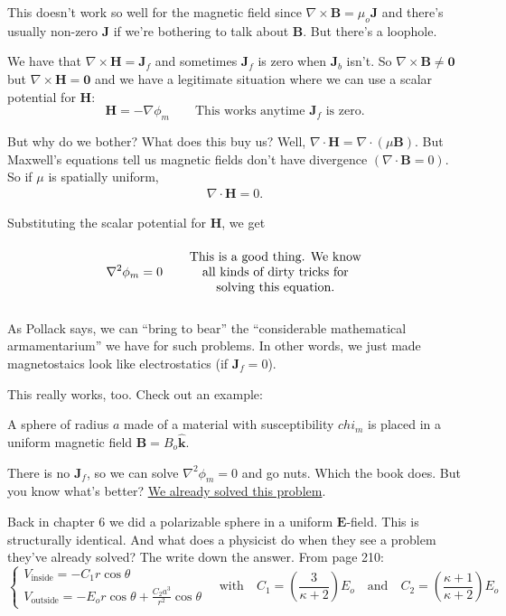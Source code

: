 \documentclass{article}
\numberwithin{equation}{section}
\newcommand{\khat}{\mathbf{\hat{k}}}
\begin{document}
This doesn't work so well for the magnetic field since $\nabla \times \bm{B} = \mu_o \bm{J}$ and there's usually non-zero $\bm{J}$ if we're bothering to talk about $\bm{B}$. But there's a loophole.

We have that $\nabla \times \bm{H} = \bm{J}_f$ and sometimes $\bm{J}_f$ is zero when $\bm{J}_b$ isn't. So $\nabla \times \bm{B} \neq \bm{0}$ but $\nabla \times \bm{H} = \bm{0}$ and we have a legitimate situation where we can use a scalar potential for $\bm{H}$:
\begin{equation*}
    \bm{H} = -\nabla \phi_m \qquad \text{This works anytime } \bm{J}_f \text{ is zero.}
\end{equation*}

But why do we bother? What does this buy us? Well, $\nabla \cdot \bm{H} = \nabla \cdot \left( \mu \bm{B} \right)$. But Maxwell's equations tell us magnetic fields don't have divergence $\left( \nabla \cdot \bm{B} = 0 \right)$.  So if $\mu$ is spatially uniform,
\begin{gather*}
    \nabla \cdot \bm{H} = 0.
\end{gather*}

Substituting the scalar potential for $\bm{H}$, we get
\begin{equation*}
    \nabla^2 \phi_m = 0 \qquad {\parbox[c]{0.4\linewidth}{\begin{center} This is a good thing. We know all kinds of dirty tricks for solving this equation. \end{center}}}
\end{equation*}

As Pollack says, we can ``bring to bear'' the ``considerable mathematical armamentarium'' we have for such problems. In other words, we just made magnetostaics look like electrostatics (if $\bm{J}_f = 0$).

This really works, too. Check out an example:

A sphere of radius $a$ made of a material with susceptibility $chi_m$ is placed in a uniform magnetic field $\bm{B} = B_o \khat$.

There is no $\bm{J}_f$, so we can solve $\nabla^2 \phi_m = 0$ and go nuts. Which the book does. But you know what's better? \underline{We already solved this problem}.

Back in chapter 6 we did a polarizable sphere in a uniform $\bm{E}$-field. This is structurally identical. And what does a physicist do when they see a problem they've already solved? The write down the answer. From page 210:
\begin{equation*}
    \begin{cases} \displaystyle V_{\text{inside}} = -C_1 r \cos{\theta} \\[0.5cm] \displaystyle V_{\text{outside}} = -E_o r \cos{\theta} + \frac{C_2 a^3}{r^2} \cos{\theta} \end{cases} \quad \text{with} \quad C_1 = \left( \frac{3}{\kappa + 2} \right) E_o \quad \text{and} \quad C_2 = \left( \frac{\kappa + 1}{\kappa + 2} \right) E_o
\end{equation*}
\end{document}
